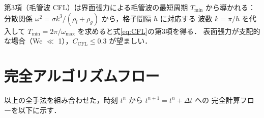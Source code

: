 \documentclass[12pt, a4paper, titlepage]{article}
\newcommand{\jp}[1]{{\normalfont\jpfont #1}}
\begin{document}
\jp{第3項（毛管波 CFL）は界面張力による毛管波の最短周期 $T_{\min}$ から導かれる：
分散関係 $\omega^2 = \sigma k^3/(\rho_l+\rho_g)$ から，格子間隔 $h$ に対応する
波数 $k=\pi/h$ を代入して $T_{\min} = 2\pi/\omega_{\max}$ を求めると式\eqref{eq:CFL}の第3項を得る．
表面張力が支配的な場合（We $\ll$ 1），$C_{\mathrm{CFL}} \leq 0.3$ が望ましい．}


\section{\jp{完全アルゴリズムフロー}}
\label{sec:algorithm}

\jp{以上の全手法を組み合わせた，時刻 $t^n$ から $t^{n+1} = t^n + \Delta t$ への
完全計算フローを以下に示す．}
\end{document}
